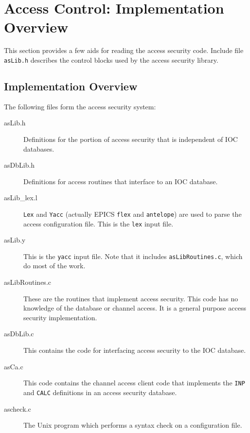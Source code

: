 \section{Access Control: Implementation Overview}

This section provides a few aids for reading the access security code.
Include file \verb|asLib.h| describes the control blocks used by the access security library.

\subsection{Implementation Overview}

The following files form the access security system:

\begin{description}
\item[asLib.h]

Definitions for the portion of access security that is independent of IOC databases.

\item[asDbLib.h]

Definitions for access routines that interface to an IOC database.

\item[asLib\_lex.l]

\verb|Lex| and \verb|Yacc| (actually EPICS \verb|flex| and \verb|antelope|) are used to parse the access configuration file. This is the \verb|lex| input file.

\item[asLib.y]

This is the \verb|yacc| input file. Note that it includes \verb|asLibRoutines.c|, which do most of the work.

\item[asLibRoutines.c]

These are the routines that implement access security. This code has no knowledge of the database or channel access. It is a general purpose access security implementation.

\item[asDbLib.c]

This contains the code for interfacing access security to the IOC database.

\item[asCa.c]

This code contains the channel access client code that implements the \verb|INP| and \verb|CALC| definitions in an access security database.

\item[ascheck.c]

The Unix program which performs a syntax check on a configuration file.
\end{description}

